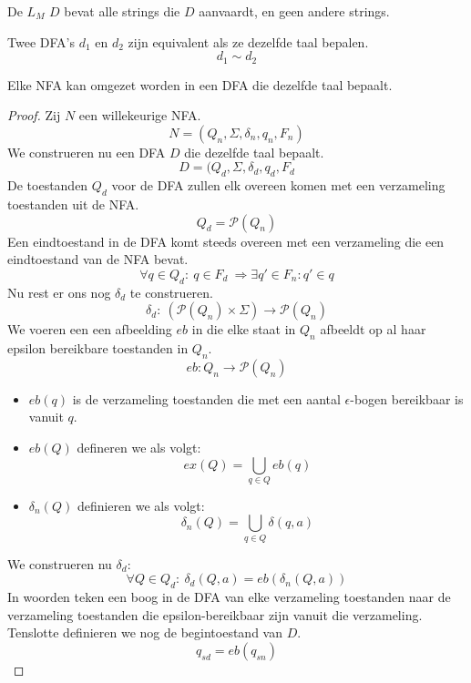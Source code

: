 \documentclass[main.tex]{subfiles}
\begin{document}
\begin{de}
  De  $L_{M}$  $D$ bevat alle strings die $D$ aanvaardt, en geen andere strings.
\end{de}

\begin{de}
  Twee DFA's $d_{1}$ en $d_{2}$ zijn equivalent als ze dezelfde taal bepalen.
  \[ d_{1} \sim d_{2} \]
\end{de}

\begin{st}
  Elke NFA kan omgezet worden in een DFA die dezelfde taal bepaalt.
  
  \begin{proof}
    Zij $N$ een willekeurige NFA.
    \[ N = (Q_{n},\Sigma,\delta_{n},q_{n},F_{n}) \]
    We construeren nu een DFA $D$ die dezelfde taal bepaalt.
    \[ D = (Q_{d},\Sigma,\delta_{d},q_{d},F_{d}\]
    De toestanden $Q_{d}$ voor de DFA zullen elk overeen komen met een verzameling toestanden uit de NFA.
    \[ Q_d = \mathcal{P}(Q_{n})\]
    Een eindtoestand in de DFA komt steeds overeen met een verzameling die een eindtoestand van de NFA bevat.
    \[ \forall q\in Q_{d}:\ q\in F_{d}\ \Rightarrow \exists q' \in F_{n}: q' \in q\]
    Nu rest er ons nog $\delta_{d}$ te construeren.
    \[
    \delta_{d}:\ (\mathcal{P}(Q_{n}) \times \Sigma) \rightarrow \mathcal{P}(Q_{n})
    \]
    We voeren een een afbeelding $eb$ in die elke staat in $Q_{n}$ afbeeldt op al haar epsilon bereikbare toestanden in $Q_{n}$.
    \[ eb: Q_{n} \rightarrow \mathcal{P}(Q_{n}) \]
    \begin{itemize}
    \item $eb(q)$ is de verzameling toestanden die met een aantal $\epsilon$-bogen bereikbaar is vanuit $q$.
    \item $eb(Q)$ defineren we als volgt:
      \[ ex(Q) = \bigcup_{q\in Q} eb(q)\]
    \item $\delta_{n}(Q)$ definieren we als volgt:
      \[ \delta_{n}(Q) = \bigcup_{q\in Q} \delta(q,a) \]
    \end{itemize}
    We construeren nu $\delta_{d}$:
    \[ \forall Q\in Q_{d}:\ \delta_{d}(Q,a) = eb(\delta_{n}(Q,a)) \]
    In woorden teken een boog in de DFA van elke verzameling toestanden naar de verzameling toestanden die epsilon-bereikbaar zijn vanuit die verzameling.
    Tenslotte definieren we nog de begintoestand van $D$.
    \[ q_{sd} = eb(q_{sn}) \]
  \end{proof}
\end{st}
\end{document}
